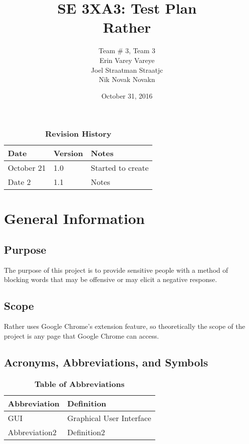 \documentclass[12pt, titlepage]{article}
\title{SE 3XA3: Test Plan\\Rather}
\author{Team \# 3, Team 3
		\\ Erin Varey Vareye
		\\ Joel Straatman Straatjc
		\\ Nik Novak 	Novakn
}
\date{October 31, 2016}
\begin{document}
\maketitle
{}
\tableofcontents
\listoftables
\begin{table}[bp]
\caption{\bf Revision History}
\begin{tabularx}{\textwidth}{p{3cm}p{2cm}X}
\toprule {\bf Date} & {\bf Version} & {\bf Notes}\\
\midrule
October 21 & 1.0 & Started to create\\
Date 2 & 1.1 & Notes\\
\bottomrule
\end{tabularx}
\end{table}
\newpage
{}

\section{General Information}
\subsection{Purpose}
The purpose of this project is to provide sensitive people with a method of blocking words that may be offensive or may elicit a negative response.
\subsection{Scope}
Rather uses Google Chrome's extension feature, so theoretically the scope of the project is any page that Google Chrome can access.
\subsection{Acronyms, Abbreviations, and Symbols}
	
\begin{table}[hbp]
\caption{\textbf{Table of Abbreviations}} \label{Table}
\begin{tabularx}{\textwidth}{p{3cm}X}
\toprule
\textbf{Abbreviation} & \textbf{Definition} \\
\midrule
GUI & Graphical User Interface\\
Abbreviation2 & Definition2\\
\bottomrule
\end{tabularx}
\end{table}
\end{document}
